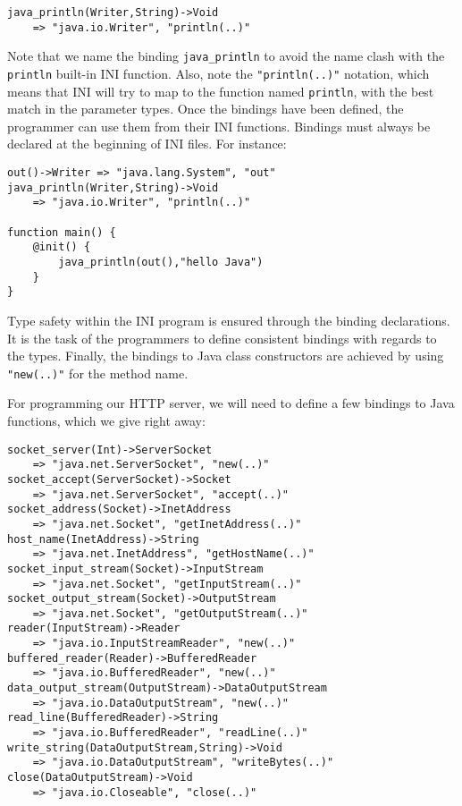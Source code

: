 \documentclass[11pt]{report}
\begin{document}
\begin{lstlisting}[numbers=none]
java_println(Writer,String)->Void
	=> "java.io.Writer", "println(..)"
\end{lstlisting}

Note that we name the binding \texttt{java\_println} to avoid the name clash with the \texttt{println} built-in INI function. Also, note the \texttt{"println(..)"} notation, which means that INI will try to map to the function named \texttt{println}, with the best match in the parameter types. Once the bindings have been defined, the programmer can use them from their INI functions. Bindings must always be declared at the beginning of INI files. For instance:

\begin{lstlisting}
out()->Writer => "java.lang.System", "out"
java_println(Writer,String)->Void
	=> "java.io.Writer", "println(..)"

function main() {
	@init() {
		java_println(out(),"hello Java")
	}
}
\end{lstlisting}

Type safety within the INI program is ensured through the binding declarations. It is the task of the programmers to define consistent bindings with regards to the types. Finally, the bindings to Java class constructors are achieved by using \texttt{"new(..)"} for the method name.

For programming our HTTP server, we will need to define a few bindings to Java functions, which we give right away:

{\small \begin{lstlisting}
socket_server(Int)->ServerSocket
	=> "java.net.ServerSocket", "new(..)"
socket_accept(ServerSocket)->Socket
	=> "java.net.ServerSocket", "accept(..)"
socket_address(Socket)->InetAddress
	=> "java.net.Socket", "getInetAddress(..)"
host_name(InetAddress)->String
	=> "java.net.InetAddress", "getHostName(..)"
socket_input_stream(Socket)->InputStream
	=> "java.net.Socket", "getInputStream(..)"
socket_output_stream(Socket)->OutputStream
	=> "java.net.Socket", "getOutputStream(..)"
reader(InputStream)->Reader
	=> "java.io.InputStreamReader", "new(..)"
buffered_reader(Reader)->BufferedReader
	=> "java.io.BufferedReader", "new(..)"
data_output_stream(OutputStream)->DataOutputStream
	=> "java.io.DataOutputStream", "new(..)"
read_line(BufferedReader)->String
	=> "java.io.BufferedReader", "readLine(..)"
write_string(DataOutputStream,String)->Void
	=> "java.io.DataOutputStream", "writeBytes(..)"
close(DataOutputStream)->Void
	=> "java.io.Closeable", "close(..)"
\end{lstlisting} }
\end{document}
